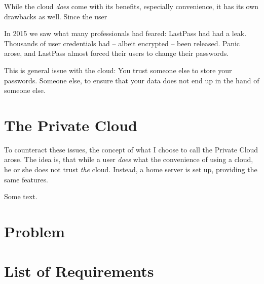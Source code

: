 		While the cloud \emph{does} come with its benefits, especially convenience, it has its own drawbacks as well. Since the user 








		In 2015 we saw what many professionals had feared: LastPass had had a leak. Thousands of user credentials had -- albeit encrypted -- been released. Panic arose, and LastPass almost forced their users to change their passwords.

		This is general issue with the cloud: You trust someone else to store your passwords. Someone else, to ensure that your data does not end up in the hand of someone else.

	\section{The Private Cloud}
		To counteract these issues, the concept of what I choose to call the Private Cloud arose. The idea is, that while a user \emph{does} what the convenience of using a cloud, he or she does not trust \emph{the} cloud. Instead, a home server is set up, providing the same features.
















	Some text.

	\section{Problem}
	\section{List of Requirements}